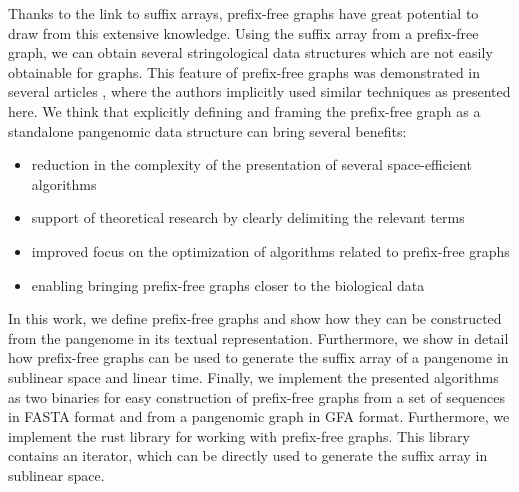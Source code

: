 Thanks to the link to suffix arrays, prefix-free graphs have great potential to draw from this extensive knowledge.
Using the suffix array from a prefix-free graph, we can obtain several stringological data structures which are not easily obtainable for graphs.
This feature of prefix-free graphs was demonstrated in several articles \cite{2019boucher,rossi2022moni,2022pfwg,2022maria}, where the authors implicitly used similar techniques as presented here.
We think that explicitly defining and framing the prefix-free graph as a standalone pangenomic data structure can bring several benefits:

\begin{itemize}
    \item reduction in the complexity of the presentation of several space-efficient algorithms
    \item support of theoretical research by clearly delimiting the relevant terms
    \item improved focus on the optimization of algorithms related to prefix-free graphs
    \item enabling bringing prefix-free graphs closer to the biological data
\end{itemize}

In this work, we define prefix-free graphs and show how they can be constructed from the pangenome in its textual representation.
Furthermore, we show in detail how prefix-free graphs can be used to generate the suffix array of a pangenome in sublinear space and linear time.
Finally, we implement the presented algorithms as two binaries for easy construction of prefix-free graphs from a set of sequences in FASTA format and from a pangenomic graph in GFA format.
Furthermore, we implement the rust library for working with prefix-free graphs.
This library contains an iterator, which can be directly used to generate the suffix array in sublinear space.

